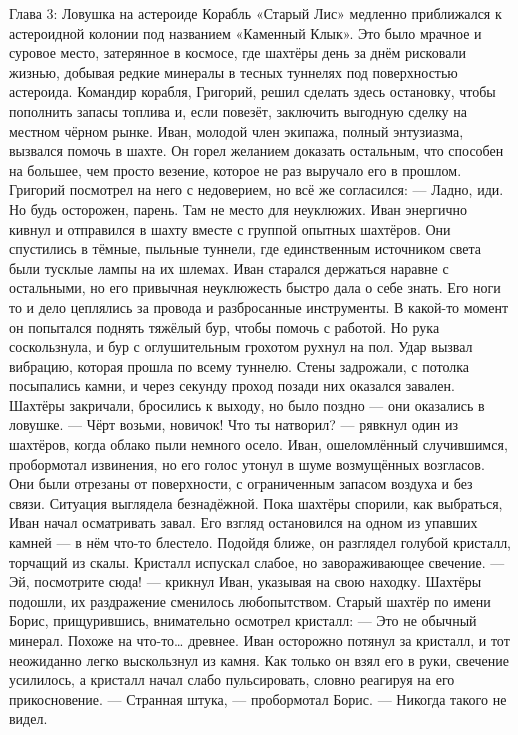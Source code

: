 \documentclass[12pt,a4paper]{book}
\begin{document}
Глава 3: Ловушка на астероиде
Корабль «Старый Лис» медленно приближался к астероидной колонии под названием «Каменный Клык». Это было мрачное и суровое место, затерянное в космосе, где шахтёры день за днём рисковали жизнью, добывая редкие минералы в тесных туннелях под поверхностью астероида. Командир корабля, Григорий, решил сделать здесь остановку, чтобы пополнить запасы топлива и, если повезёт, заключить выгодную сделку на местном чёрном рынке.
Иван, молодой член экипажа, полный энтузиазма, вызвался помочь в шахте. Он горел желанием доказать остальным, что способен на большее, чем просто везение, которое не раз выручало его в прошлом. Григорий посмотрел на него с недоверием, но всё же согласился:
— Ладно, иди. Но будь осторожен, парень. Там не место для неуклюжих.
Иван энергично кивнул и отправился в шахту вместе с группой опытных шахтёров. Они спустились в тёмные, пыльные туннели, где единственным источником света были тусклые лампы на их шлемах. Иван старался держаться наравне с остальными, но его привычная неуклюжесть быстро дала о себе знать. Его ноги то и дело цеплялись за провода и разбросанные инструменты.
В какой-то момент он попытался поднять тяжёлый бур, чтобы помочь с работой. Но рука соскользнула, и бур с оглушительным грохотом рухнул на пол. Удар вызвал вибрацию, которая прошла по всему туннелю. Стены задрожали, с потолка посыпались камни, и через секунду проход позади них оказался завален. Шахтёры закричали, бросились к выходу, но было поздно — они оказались в ловушке.
— Чёрт возьми, новичок! Что ты натворил? — рявкнул один из шахтёров, когда облако пыли немного осело.
Иван, ошеломлённый случившимся, пробормотал извинения, но его голос утонул в шуме возмущённых возгласов. Они были отрезаны от поверхности, с ограниченным запасом воздуха и без связи. Ситуация выглядела безнадёжной.
Пока шахтёры спорили, как выбраться, Иван начал осматривать завал. Его взгляд остановился на одном из упавших камней — в нём что-то блестело. Подойдя ближе, он разглядел голубой кристалл, торчащий из скалы. Кристалл испускал слабое, но завораживающее свечение.
— Эй, посмотрите сюда! — крикнул Иван, указывая на свою находку.
Шахтёры подошли, их раздражение сменилось любопытством. Старый шахтёр по имени Борис, прищурившись, внимательно осмотрел кристалл:
— Это не обычный минерал. Похоже на что-то… древнее.
Иван осторожно потянул за кристалл, и тот неожиданно легко выскользнул из камня. Как только он взял его в руки, свечение усилилось, а кристалл начал слабо пульсировать, словно реагируя на его прикосновение.
— Странная штука, — пробормотал Борис. — Никогда такого не видел.
\end{document}
